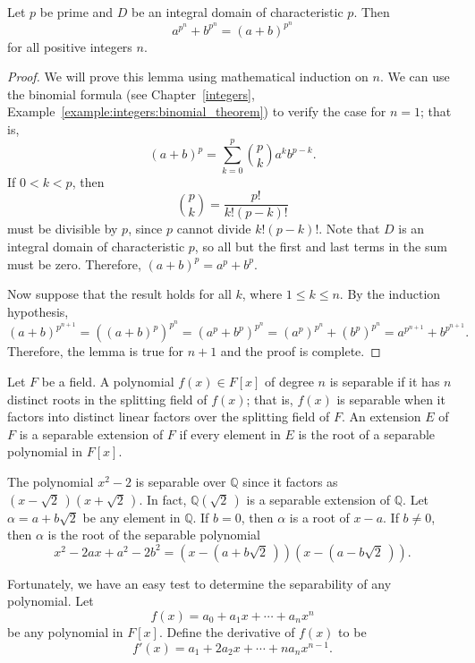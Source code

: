 \begin{lemma}\label{finite:freshmans_dream}
Let $p$ be prime and $D$ be an integral domain of characteristic $p$.  Then
\[
a^{p^n} + b^{p^n} = (a + b)^{p^n}
\]
for all positive integers $n$.  
\end{lemma}

\begin{proof}
We will prove this lemma using mathematical induction on $n$.  We can use the binomial formula (see Chapter~\ref{integers}, Example~\ref{example:integers:binomial_theorem}) to verify the case for $n = 1$; that is,
\[
(a+b)^p 
= 
\sum_{k=0}^{p} 
\binom{p}{k}
a^k b^{p-k}.
\]
If $0 < k < p$, then
\[
\binom{p}{k}
=
\frac{p!}{k!(p-k)!}
\]
must be divisible by $p$, since $p$ cannot divide $k!(p - k)!$.  Note that $D$ is an integral domain of characteristic $p$, so all but the first and last terms in the sum must be zero.  Therefore, $(a + b)^p =
a^p + b^p$.  

Now suppose that the result holds for all $k$, where $1 \leq k \leq n$.  By the induction hypothesis,
\[
(a + b)^{p^{n + 1}}
=
((a + b)^p)^{p^{n}}
=
(a^p + b^p)^{p^{n}}
=
(a^p)^{p^{n}} + (b^p)^{p^{n}}
=
a^{p^{n + 1}} + b^{p^{n + 1}}.
\]
Therefore, the lemma is true for $n + 1$ and the proof is complete.
\end{proof}

\medskip

Let $F$ be a field.  A polynomial $f(x) \in F[x]$ of degree $n$ is {\bfi separable\/} if it has $n$ distinct roots in the splitting field of $f(x)$; that is, $f(x)$ is separable when it factors into distinct linear factors over the splitting field of $F$.  An extension $E$ of $F$ is a {\bfi separable extension\/} of $F$ if every element in $E$ is the root of a separable polynomial in $F[x]$.   

\begin{example}{}
The polynomial $x^2 - 2$ is separable over ${\mathbb Q}$ since it factors as $(x - \sqrt{2}\, )(x + \sqrt{2}\, )$. In fact, ${\mathbb Q}(\sqrt{2}\, )$ is a separable extension of ${\mathbb Q}$.  Let $\alpha =  a + b \sqrt{2}$ be any element in ${\mathbb Q}$. If $b = 0$, then $\alpha$ is a root of $x - a$.  If $b \neq 0$, then $\alpha$ is the root  of the separable polynomial 
\[
x^2 - 2 a x + a^2 - 2 b^2 = (x - (a + b \sqrt{2}\, ))(x - (a - b \sqrt{2}\, )).
\]
\end{example}
 
Fortunately, we have an easy test to  determine the separability of any polynomial.  Let
\[
f(x) = a_0 + a_1 x + \cdots + a_n x^n
\]
be any polynomial in  $F[x]$. Define the {\bfi derivative\/} of $f(x)$ to be 
\[
f'(x) = a_1  + 2 a_2 x + \cdots + n a_n x^{n-1}.
\]

